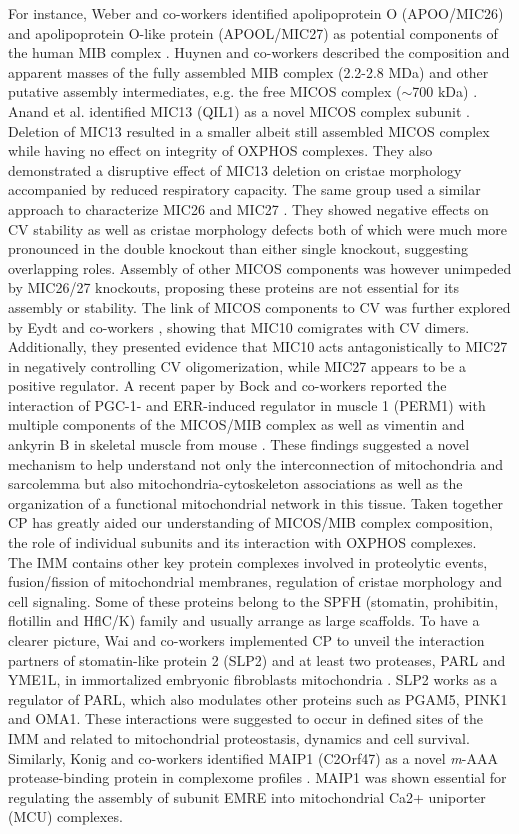 For instance, Weber and co-workers identified apolipoprotein O (APOO/MIC26) and apolipoprotein O-like protein (APOOL/MIC27) as potential components of the human MIB complex \cite{Weber_2013}. Huynen and co-workers described the composition and apparent masses of the fully assembled MIB complex (2.2-2.8 MDa) and other putative assembly intermediates, e.g. the free MICOS complex ($\sim$700 kDa) \cite{Huynen_2016}. Anand et al. identified MIC13 (QIL1) as a novel MICOS complex subunit \cite{Anand_2016}. Deletion of MIC13 resulted in a smaller albeit still assembled MICOS complex while having no effect on integrity of OXPHOS complexes. They also demonstrated a disruptive effect of MIC13 deletion on cristae morphology accompanied by reduced respiratory capacity. The same group used a similar approach to characterize MIC26 and MIC27 \cite{Anand_2020}. They showed negative effects on CV stability as well as cristae morphology defects both of which were much more pronounced in the double knockout than either single knockout, suggesting overlapping roles. Assembly of other MICOS components was however unimpeded by MIC26/27 knockouts, proposing these proteins are not essential for its assembly or stability. The link of MICOS components to CV was further explored by Eydt and co-workers \cite{Eydt_2017}, showing that MIC10 comigrates with CV dimers. Additionally, they presented evidence that MIC10 acts antagonistically to MIC27 in negatively controlling CV oligomerization, while MIC27 appears to be a positive regulator. A recent paper by Bock and co-workers reported the interaction of  PGC-1- and ERR-induced regulator in muscle 1 (PERM1) with multiple components of the MICOS/MIB complex as well as vimentin and ankyrin B in skeletal muscle from mouse \cite{Bock_2021}. These findings suggested a novel mechanism to help understand not only the interconnection of mitochondria and sarcolemma but also mitochondria-cytoskeleton associations as well as the organization of a functional mitochondrial network in this tissue. Taken together CP has greatly aided our understanding of MICOS/MIB complex composition, the role of individual subunits and its interaction with OXPHOS complexes.\\
The IMM contains other key protein complexes involved in proteolytic events, fusion/fission of mitochondrial membranes, regulation of cristae morphology and cell signaling. Some of these proteins belong to the SPFH (stomatin, prohibitin, flotillin and HflC/K) family and usually arrange as large scaffolds. To have a clearer picture, Wai and co-workers implemented CP to unveil the interaction partners of stomatin-like protein 2 (SLP2) and at least two proteases, PARL and YME1L, in immortalized embryonic fibroblasts mitochondria \cite{Wai_2016}. SLP2 works as a regulator of PARL, which also modulates other proteins such as PGAM5, PINK1 and OMA1. These interactions were suggested to occur in defined sites of the IMM and related to mitochondrial proteostasis, dynamics and cell survival. Similarly, Konig and co-workers identified MAIP1 (C2Orf47) as a novel \emph{m}-AAA protease-binding protein in complexome profiles \cite{Konig_2016}. MAIP1 was shown essential for regulating the assembly of subunit EMRE into mitochondrial Ca2+ uniporter (MCU) complexes.\\ 
